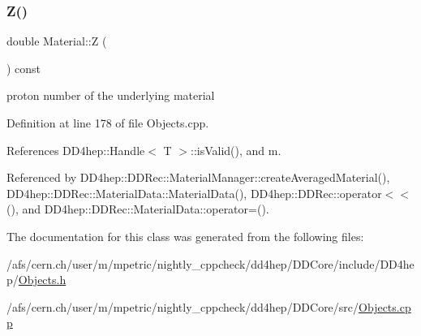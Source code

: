 \subsubsection{\texorpdfstring{Z()}{Z()}}
{\footnotesize\ttfamily double Material\+::Z (\begin{DoxyParamCaption}{ }\end{DoxyParamCaption}) const}



proton number of the underlying material 



Definition at line 178 of file Objects.\+cpp.



References D\+D4hep\+::\+Handle$<$ T $>$\+::is\+Valid(), and m.



Referenced by D\+D4hep\+::\+D\+D\+Rec\+::\+Material\+Manager\+::create\+Averaged\+Material(), D\+D4hep\+::\+D\+D\+Rec\+::\+Material\+Data\+::\+Material\+Data(), D\+D4hep\+::\+D\+D\+Rec\+::operator$<$$<$(), and D\+D4hep\+::\+D\+D\+Rec\+::\+Material\+Data\+::operator=().



The documentation for this class was generated from the following files\+:\begin{DoxyCompactItemize}
\item 
/afs/cern.\+ch/user/m/mpetric/nightly\+\_\+cppcheck/dd4hep/\+D\+D\+Core/include/\+D\+D4hep/\hyperlink{_objects_8h}{Objects.\+h}\item 
/afs/cern.\+ch/user/m/mpetric/nightly\+\_\+cppcheck/dd4hep/\+D\+D\+Core/src/\hyperlink{_objects_8cpp}{Objects.\+cpp}\end{DoxyCompactItemize}
